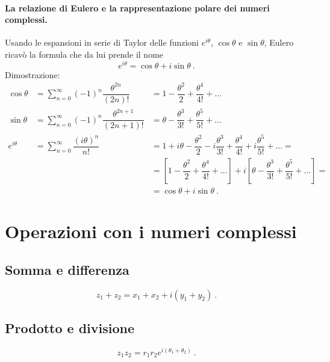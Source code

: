 \paragraph{La relazione di Eulero e la rappresentazione polare dei numeri complessi.} Usando le espansioni in serie di Taylor delle funzioni $e^{i\theta}$, $\cos \theta$ e $\sin \theta$, Eulero ricavò la formula che da lui prende il nome
\begin{equation}
  e^{i \theta} = \cos \theta + i \sin \theta \ .
\end{equation}
Dimostrazione:
\begin{equation}
\begin{array}{rll}
   \cos \theta  & = \sum_{n=0}^{\infty} (-1)^n \dfrac{\theta^{2n}}{(2n)!} & = 1 - \dfrac{\theta^2}{2} + \dfrac{\theta^4}{4!} + \dots \\
   \sin \theta  & = \sum_{n=0}^{\infty} (-1)^n \dfrac{\theta^{2n+1}}{(2n+1)!} & = \theta - \dfrac{\theta^3}{3!} + \dfrac{\theta^5}{5!} + \dots \\
   e^{i \theta} & = \sum_{n=0}^{\infty} \dfrac{(i\theta)^n}{n!} & = 1 + i\theta - \dfrac{\theta^2}{2} - i \dfrac{\theta^3}{3!} + \dfrac{\theta^4}{4!} + i \dfrac{\theta^5}{5!} +  \dots = \\
  & & = \left[  1 - \dfrac{\theta^2}{2} + \dfrac{\theta^4}{4!} + \dots \right] + i \left[ \theta - \dfrac{\theta^3}{3!} + \dfrac{\theta^5}{5!} + \dots \right]  = \\
  & & = \cos \theta + i \sin \theta \ .
\end{array}
\end{equation}

\section{Operazioni con i numeri complessi}

\subsection{Somma e differenza}
\begin{equation}
   z_1 + z_2 = x_1 + x_2 + i (y_1 + y_2) \ .
\end{equation}

\subsection{Prodotto e divisione}
\begin{equation}
   z_1 z_2 = r_1 r_2 e^{i(\theta_1+\theta_2)} \ .
\end{equation}

